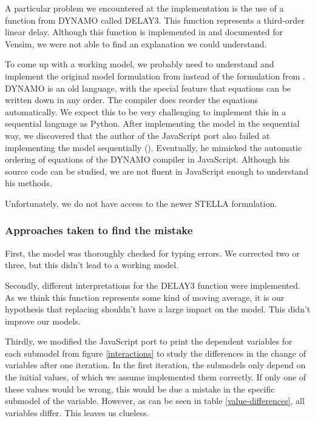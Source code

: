 \documentclass[10pt,a4paper]{scrartcl}
\begin{document}
A particular problem we encountered at the implementation is the use of a function from DYNAMO called DELAY3. This function represents a third-order linear delay. Although this function is implemented in and documented for Vensim, we were not able to find an explanation we could understand.

To come up with a working model, we probably need to understand and implement the original model formulation from \cite{forresterworld} instead of the formulation from \cite{thissen1978investigations}. DYNAMO is an old language, with the special feature that equations can be written down in any order. The compiler does reorder the equations automatically. We expect this to be very challenging to implement this in a sequential language as Python.  After implementing the model in the sequential way, we discovered that the author of the JavaScript port also failed at implementing the model sequentially (\cite{blogpost}). Eventually, he mimicked the automatic ordering of equations of the DYNAMO compiler in JavaScript. Although his source code can be studied, we are not fluent in JavaScript enough to understand his methods.

Unfortunately, we do not have access to the newer STELLA formulation.

\subsubsection*{Approaches taken to find the mistake}

First, the model was thoroughly checked for typing errors. We corrected two or three, but this didn't lead to a working model.

Secondly, different interpretations for the DELAY3 function were implemented. As we think this function represents some kind of moving average, it is our hypothesis that replacing shouldn't have a large impact on the model. This didn't improve our models.

Thirdly, we modified the JavaScript port \cite{blogpost} to print the dependent variables for each submodel from figure \ref{interactions} to study the differences in the change of variables after one iteration. In the first iteration, the submodels only depend on the initial values, of which we assume implemented them correctly. If only one of these values would be wrong, this would be due a mistake in the specific submodel of the variable. However, as can be seen in table \ref{value-differences}, all variables differ. This leaves us clueless.
\end{document}
